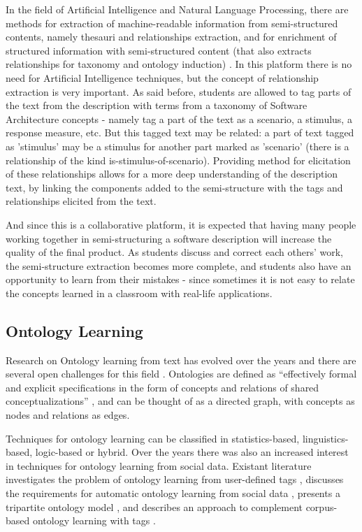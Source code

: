In the field of Artificial Intelligence and Natural Language Processing, there are methods for extraction of machine-readable information from semi-structured contents, namely thesauri and relationships extraction, and for enrichment of structured information with semi-structured content (that also extracts relationships for taxonomy and ontology induction) \cite{hovy2013collaboratively}. In this platform there is no need for Artificial Intelligence techniques, but the concept of relationship extraction is very important. As said before, students are allowed to tag parts of the text from the description with terms from a taxonomy of Software Architecture concepts - namely tag a part of the text as a scenario, a stimulus, a response measure, etc. But this tagged text may be related: a part of text tagged as 'stimulus' may be a stimulus for another part marked as 'scenario' (there is a relationship of the kind is-stimulus-of-scenario). Providing method for elicitation of these relationships allows for a more deep understanding of the description text, by linking the components added to the semi-structure with the tags and relationships elicited from the text.

And since this is a collaborative platform, it is expected that having many people working together in semi-structuring a software description will increase the quality of the final product. 
As students discuss and correct each others' work, the semi-structure extraction becomes more complete, and students also have an opportunity to learn from their mistakes - since sometimes it is not easy to relate the concepts learned in a classroom with real-life applications.


	
\subsection{Ontology Learning}
Research on Ontology learning from text has evolved over the years and there are several open challenges for this field \cite{wong2012ontology}. Ontologies are defined as ``effectively formal and explicit specifications in the form of concepts and relations of shared conceptualizations'' \cite{gruber1993translation}, and can be thought of as a directed graph, with concepts as nodes and relations as edges.
 
Techniques for ontology learning can be classified in statistics-based, linguistics-based, logic-based or hybrid. Over the years there was also an increased interest in techniques for ontology learning from social data. Existant literature investigates the problem of ontology learning from user-defined tags \cite{tang2009towards}, discusses the requirements for automatic ontology learning from social data \cite{kotis2011automated}, presents a tripartite ontology model \cite{mika2007ontologies}, and describes an approach to complement corpus-based ontology learning with tags \cite{weichselbraun2010augmenting}.

